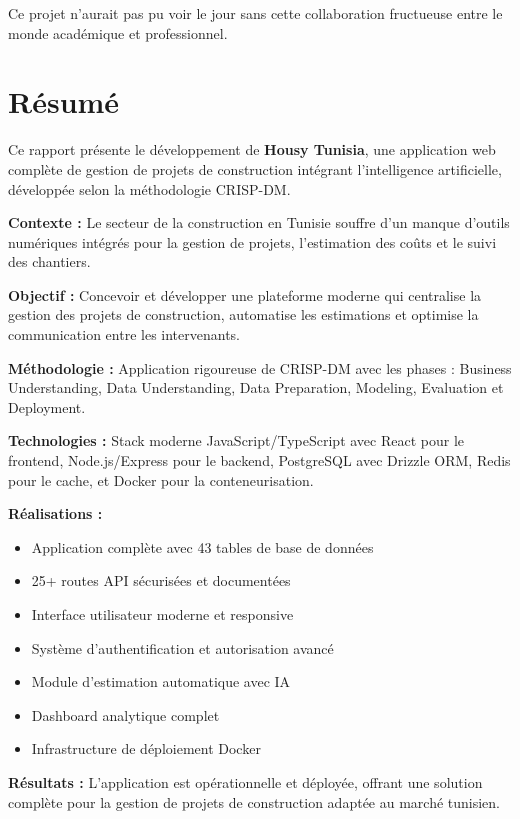 \documentclass[12pt, a4paper]{report}
\begin{document}
Ce projet n'aurait pas pu voir le jour sans cette collaboration fructueuse entre le monde académique et professionnel.

\chapter*{Résumé}

Ce rapport présente le développement de \textbf{Housy Tunisia}, une application web complète de gestion de projets de construction intégrant l'intelligence artificielle, développée selon la méthodologie CRISP-DM.

\textbf{Contexte :} Le secteur de la construction en Tunisie souffre d'un manque d'outils numériques intégrés pour la gestion de projets, l'estimation des coûts et le suivi des chantiers.

\textbf{Objectif :} Concevoir et développer une plateforme moderne qui centralise la gestion des projets de construction, automatise les estimations et optimise la communication entre les intervenants.

\textbf{Méthodologie :} Application rigoureuse de CRISP-DM avec les phases : Business Understanding, Data Understanding, Data Preparation, Modeling, Evaluation et Deployment.

\textbf{Technologies :} Stack moderne JavaScript/TypeScript avec React pour le frontend, Node.js/Express pour le backend, PostgreSQL avec Drizzle ORM, Redis pour le cache, et Docker pour la conteneurisation.

\textbf{Réalisations :} 
\begin{itemize}
    \item Application complète avec 43 tables de base de données
    \item 25+ routes API sécurisées et documentées
    \item Interface utilisateur moderne et responsive
    \item Système d'authentification et autorisation avancé
    \item Module d'estimation automatique avec IA
    \item Dashboard analytique complet
    \item Infrastructure de déploiement Docker
\end{itemize}

\textbf{Résultats :} L'application est opérationnelle et déployée, offrant une solution complète pour la gestion de projets de construction adaptée au marché tunisien.
\end{document}
